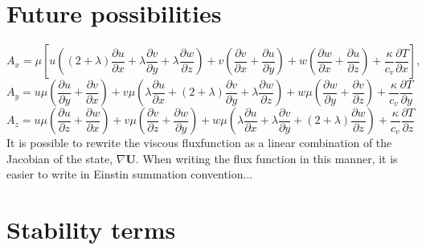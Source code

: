 \documentclass{report}
\newcommand{\dx}[1]{\frac{\partial #1}{\partial x}}
\newcommand{\dy}[1]{\frac{\partial #1}{\partial y}}
\newcommand{\dz}[1]{\frac{\partial #1}{\partial z}}
\begin{document}
\chapter{Future possibilities}

\begin{equation}
\label{e:energyBalance_AxLong}
A_x = \mu \left [
u \left( (2+\lambda)\dx{u} + \lambda \dy{v} + \lambda \dz{w} \right)
+ v \left( \dx{v} + \dy{u} \right) 
+ w \left( \dx{w} + \dz{u} \right)
+ \frac{\kappa}{c_v} \dx{T}
\right],
\end{equation}
\begin{equation}
\label{e:energyBalance_AyLong}
A_y = u \mu \left( \dy{u} + \dx{v} \right)
+ v \mu \left( \lambda \dx{u} + (2+\lambda)\dy{v} + \lambda \dz{w} \right)
+ w \mu \left( \dy{w} + \dz{v} \right)
+ \frac{\kappa}{c_v}\dy{T}
\end{equation}
\begin{equation}
\label{e:energyBalance_AzLong}
A_z = u \mu \left( \dz{u} + \dx{w} \right)
+ v \mu \left( \dz{v} + \dy{w} \right)
+ w \mu \left( \lambda\dx{u} + \lambda\dy{v} + (2+\lambda)\dz{w} \right)
+ \frac{\kappa}{c_v}\dz{T}
\end{equation}
It is possible to rewrite the viscous fluxfunction as a linear combination of the Jacobian of the state, $\nabla \mathbf{U}$. When writing the flux function in this manner, it is easier to write in Einstin summation convention...

\chapter{Stability terms}


\end{document}
